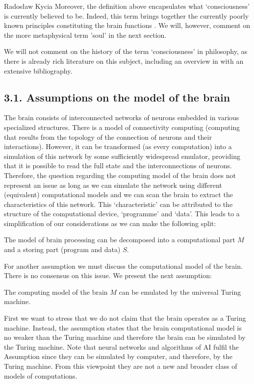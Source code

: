 \begin{artengenv}{Radosław Kycia}
Moreover, the definition above encapsulates what `consciousness' is currently believed to be. Indeed, this term brings together the currently poorly known principles constituting the brain functions \parencite[see, e.g.][]{Transhumanizm}. We will, however, comment on the more metaphysical term 'soul' in the next section.

We will not comment on the history of the term `consciousness' in philosophy, as there is already rich literature on this subject, including an overview in  \parencite{StanfordEncyclopedyOfPhilosophy_Conciousness} with an extensive bibliography.



\subsection{3.1. Assumptions on the model of the brain}

The brain consists of interconnected networks of neurons embedded in various specialized structures. There is a model of connectivity computing \parencite{ModellingNeurons} (computing that results from the topology of the connection of neurons and their interactions). However, it can be transformed (as every computation) into a simulation of this network by some sufficiently widespread emulator, providing that it is possible to read the full state and the interconnections of neurons. Therefore, the question regarding the computing model of the brain does not represent an issue as long as we can simulate the network using different (equivalent) computational models and we can scan the brain to extract the characteristics of this network. This `characteristic' can be attributed to the structure of the computational device, `programme' and `data'. This leads to a simplification of our considerations as we can make the following split:
\begin{Assumption}
\label{Assumption_decomposition}
 The model of brain processing can be decomposed into a computational part $M$ and a storing part (program and data) $S$. 
\end{Assumption}
For another assumption we must discuss the computational model of the brain. There is no consensus on this issue. We present the next assumption:
\begin{Assumption}
\label{Assumption_computing}
 The computing model of the brain $M$ can be emulated by the universal Turing machine.
\end{Assumption}
First we want to stress that we do not claim that the brain operates as a Turing machine. Instead, the assumption states that the brain computational model is no weaker than the Turing machine and therefore the brain can be simulated by the Turing machine. Note that neural networks and algorithms of AI fulfil the Assumption since they can be simulated by computer, and therefore, by the Turing machine. From this viewpoint they are not a new and broader class of models of computations.



\end{artengenv}
